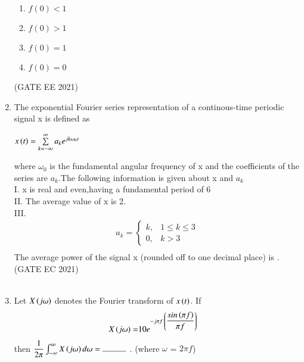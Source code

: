 \begin{enumerate}[label=\thechapter.\arabic*,ref=\thechapter.\theenumi]
\begin{enumerate}[label = (\Alph*)]
\item $f(0) < 1 $\\
\item  $f(0) > 1 $\\
\item  $f(0) = 1 $\\
\item   $f(0) = 0 $\\
\end{enumerate} \hfill{(GATE EE 2021)}\\
\solution

\pagebreak
\item The exponential Fourier series representation of a continous-time periodic signal x is defined as\\
\begin{center}
$x\left(t\right)=\sum\limits_{k=-\infty}^{\infty}a_ke^{jk\omega_0t}$\\
\end{center}
where $\omega_0$ is the fundamental angular frequency of x and the coefficients of the series are $a_k$.The following information is given about x and $a_k$\\
I. x is real and even,having a fundamental period of 6\\
II. The average value of x is 2.\\
III.\begin{align}
 a_k= \begin{cases} 
      k, & 1 \leq k \leq 3 \\
      0, &  k > 3 
   \end{cases}\\
   \end{align}
The average power of the signal x (rounded off to one decimal place) is \underline{\hspace{1cm}}. \\
\hfill(GATE EC 2021)\\
\solution\\

\pagebreak
\item Let $X\left(j \omega\right)$ denotes the Fourier transform of $x\left(t\right)$. If 
\begin{align}
X\left(j \omega\right) =& 10e^{-j\pi f \: \left(\dfrac{sin\left(\pi f\right)}{\pi f}\right)}
\end{align} 
then $ \dfrac{1}{2\pi} \int_{-\infty }^{\infty} X\brak{j \omega} d\omega = \rule{1cm}{0.15mm}$ .  (where $\omega$ = $2\pi f$)\\

\end{enumerate}

